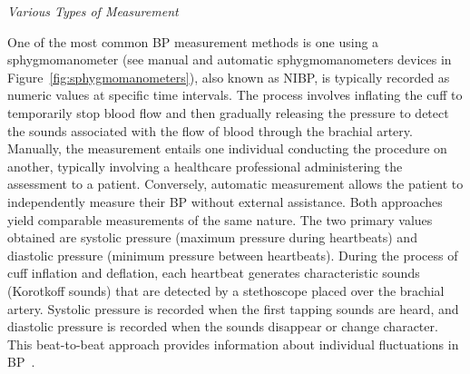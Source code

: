 \vspace{0.2cm}
\textit{Various Types of Measurement}
\vspace{0.2cm}

One of the most common BP measurement methods is one using a sphygmomanometer (see manual and automatic sphygmomanometers devices in Figure~\ref{fig:sphygmomanometers}), also known as \ac{NIBP}, is typically recorded as numeric values at specific time intervals.
The process involves inflating the cuff to temporarily stop blood flow and then gradually releasing the pressure to detect the sounds associated with the flow of blood through the brachial artery.
Manually, the measurement entails one individual conducting the procedure on another, typically involving a healthcare professional administering the assessment to a patient.
Conversely, automatic measurement allows the patient to independently measure their BP without external assistance.
Both approaches yield comparable measurements of the same nature.
The two primary values obtained are systolic pressure (maximum pressure during heartbeats) and diastolic pressure (minimum pressure between heartbeats).
During the process of cuff inflation and deflation, each heartbeat generates characteristic sounds (Korotkoff sounds) that are detected by a stethoscope placed over the brachial artery.
Systolic pressure is recorded when the first tapping sounds are heard, and diastolic pressure is recorded when the sounds disappear or change character.
This beat-to-beat approach provides information about individual fluctuations in BP~\cite{betts20BloodFlow2022}.

